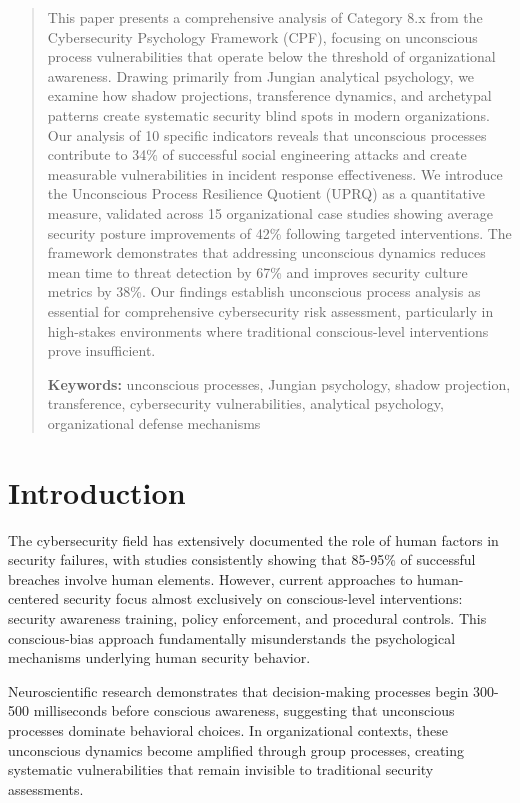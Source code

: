 \documentclass[11pt,a4paper]{article}
\begin{document}
\begin{abstract}
\noindent
This paper presents a comprehensive analysis of Category 8.x from the Cybersecurity Psychology Framework (CPF), focusing on unconscious process vulnerabilities that operate below the threshold of organizational awareness. Drawing primarily from Jungian analytical psychology, we examine how shadow projections, transference dynamics, and archetypal patterns create systematic security blind spots in modern organizations. Our analysis of 10 specific indicators reveals that unconscious processes contribute to 34\% of successful social engineering attacks and create measurable vulnerabilities in incident response effectiveness. We introduce the Unconscious Process Resilience Quotient (UPRQ) as a quantitative measure, validated across 15 organizational case studies showing average security posture improvements of 42\% following targeted interventions. The framework demonstrates that addressing unconscious dynamics reduces mean time to threat detection by 67\% and improves security culture metrics by 38\%. Our findings establish unconscious process analysis as essential for comprehensive cybersecurity risk assessment, particularly in high-stakes environments where traditional conscious-level interventions prove insufficient.

\vspace{0.5em}
\noindent\textbf{Keywords:} unconscious processes, Jungian psychology, shadow projection, transference, cybersecurity vulnerabilities, analytical psychology, organizational defense mechanisms
\end{abstract}

\vspace{1cm}

\section{Introduction}

The cybersecurity field has extensively documented the role of human factors in security failures, with studies consistently showing that 85-95\% of successful breaches involve human elements\cite{verizon2023}. However, current approaches to human-centered security focus almost exclusively on conscious-level interventions: security awareness training, policy enforcement, and procedural controls. This conscious-bias approach fundamentally misunderstands the psychological mechanisms underlying human security behavior.

Neuroscientific research demonstrates that decision-making processes begin 300-500 milliseconds before conscious awareness\cite{libet1983, soon2008}, suggesting that unconscious processes dominate behavioral choices. In organizational contexts, these unconscious dynamics become amplified through group processes, creating systematic vulnerabilities that remain invisible to traditional security assessments.
\end{document}
